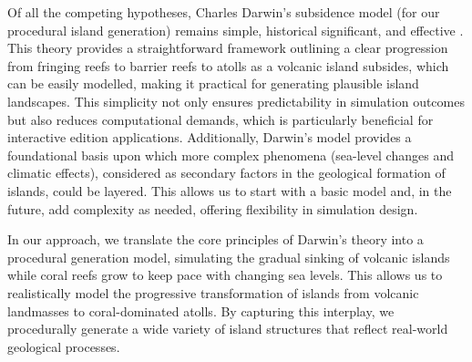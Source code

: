 

Of all the competing hypotheses, Charles Darwin's subsidence model (for our procedural island generation) remains simple, historical significant, and effective \cite{Tomascik1997}. This theory provides a straightforward framework outlining a clear progression from fringing reefs to barrier reefs to atolls as a volcanic island subsides, which can be easily modelled, making it practical for generating plausible island landscapes. This simplicity not only ensures predictability in simulation outcomes but also reduces computational demands, which is particularly beneficial for interactive edition applications. Additionally, Darwin's model provides a foundational basis upon which more complex phenomena (sea-level changes and climatic effects), considered as secondary factors in the geological formation of islands, could be layered. This allows us to start with a basic model and, in the future, add complexity as needed, offering flexibility in simulation design.

In our approach, we translate the core principles of Darwin's theory into a procedural generation model, simulating the gradual sinking of volcanic islands while coral reefs grow to keep pace with changing sea levels. This allows us to realistically model the progressive transformation of islands from volcanic landmasses to coral-dominated atolls. By capturing this interplay, we procedurally generate a wide variety of island structures that reflect real-world geological processes.

